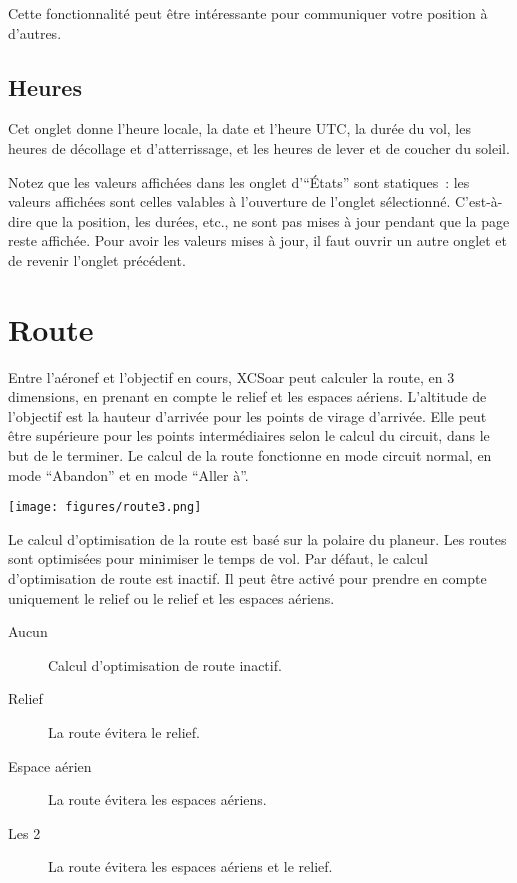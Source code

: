 Cette fonctionnalité peut être intéressante pour communiquer votre position à d'autres.

\subsection*{Heures}\label{sec:time-status}
Cet onglet donne l'heure locale, la date et l'heure UTC,
la durée du vol, les heures de décollage et d'atterrissage, et
les heures de lever et de coucher du soleil.

Notez que les valeurs affichées dans les onglet d'``États'' sont statiques~:
les valeurs affichées sont celles valables à l'ouverture de l'onglet sélectionné.
C'est-à-dire que la position, les durées, etc., ne sont pas mises à jour pendant que la page reste affichée.
Pour avoir les valeurs mises à jour, il faut ouvrir un autre onglet et de revenir l'onglet précédent. 


\section{Route}\label{sec:route}

Entre l'aéronef et l'objectif en cours, XCSoar peut calculer la route, en 3 dimensions,
en prenant en compte le relief et les espaces aériens. L'altitude de l'objectif est la hauteur
d'arrivée pour les points de virage d'arrivée. Elle peut être supérieure pour les points intermédiaires
selon le calcul du circuit, dans le but de le terminer. Le calcul de la route fonctionne en mode circuit normal, en mode ``Abandon'' et en mode ``Aller à''.

\begin{center}
\texttt{[image: figures/route3.png]}
\end{center}

Le calcul d'optimisation de la route est basé sur la polaire du planeur.
Les routes sont optimisées pour minimiser le temps de vol. Par défaut, le calcul d'optimisation de route est inactif. Il peut être activé pour prendre en compte uniquement
le relief ou le relief et les espaces aériens. 

\begin{description} 
\item[Aucun] Calcul d'optimisation de route inactif.
\item[Relief] La route évitera le relief.
\item[Espace aérien]  La route évitera les espaces aériens.
\item[Les 2] La route évitera les espaces aériens et le relief.
\end{description}

